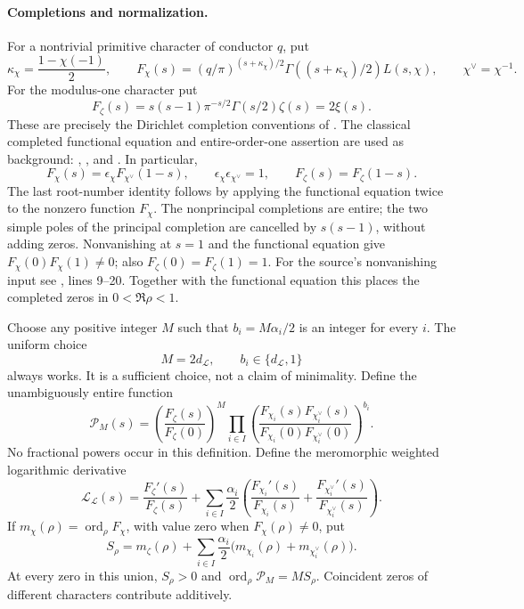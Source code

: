 \paragraph{Completions and normalization.}
For a nontrivial primitive character of conductor $q$, put
\[
 \kappa_\chi=\frac{1-\chi(-1)}2,\qquad
 F_\chi(s)=
 (q/\pi)^{(s+\kappa_\chi)/2}
 \Gamma((s+\kappa_\chi)/2)L(s,\chi),
 \qquad \chi^\vee=\chi^{-1}.
\]
For the modulus-one character put
\[
 F_\zeta(s)=s(s-1)\pi^{-s/2}\Gamma(s/2)\zeta(s)=2\xi(s).
\]
These are precisely the Dirichlet completion conventions of
. The classical completed functional equation and
entire-order-one assertion are used as background:
\cite[(25.15.5)--(25.15.6)]{dlmf2515},
\cite[\S6.1; (6.2.2)]{kedlayaFE}, and
\cite[\S1, p.~282]{rajan1998}.
In particular,
\[
 F_\chi(s)=\epsilon_\chi F_{\chi^\vee}(1-s),
 \qquad \epsilon_\chi\epsilon_{\chi^\vee}=1,\qquad
 F_\zeta(s)=F_\zeta(1-s).
\]
The last root-number identity follows by applying the functional equation
twice to the nonzero function $F_\chi$.
The nonprincipal completions are entire; the two simple poles of the
principal completion are cancelled by $s(s-1)$, without adding zeros.
Nonvanishing at $s=1$ and the functional equation give
$F_\chi(0)F_\chi(1)\ne0$; also
$F_\zeta(0)=F_\zeta(1)=1$.
For the source's nonvanishing input see
,
lines 9--20. Together with the functional equation this places the
completed zeros in $0<\Re\rho<1$.

Choose any positive integer $M$ such that
$b_i=M\alpha_i/2$ is an integer for every $i$.
The uniform choice
\[
 M=2d_{\mathcal L},\qquad
 b_i\in\{d_{\mathcal L},1\}
\]
always works. It is a sufficient choice, not a claim of minimality.
Define the unambiguously entire function
\begin{equation}\label{eq:DET18completedproduct}
 \mathscr P_M(s)=
 \left(\frac{F_\zeta(s)}{F_\zeta(0)}\right)^M
 \prod_{i\in I}
 \left(
 \frac{F_{\chi_i}(s)F_{\chi_i^\vee}(s)}
 {F_{\chi_i}(0)F_{\chi_i^\vee}(0)}
 \right)^{b_i}.
\end{equation}
No fractional powers occur in this definition. Define the meromorphic
weighted logarithmic derivative
\begin{equation}\label{eq:DET18weightedlog}
 \mathscr L_{\mathcal L}(s)=
 \frac{F_\zeta'(s)}{F_\zeta(s)}
 +\sum_{i\in I}\frac{\alpha_i}{2}
 \left(
 \frac{F_{\chi_i}'(s)}{F_{\chi_i}(s)}
 +\frac{F_{\chi_i^\vee}'(s)}{F_{\chi_i^\vee}(s)}
 \right).
\end{equation}
If $m_\chi(\rho)=\operatorname{ord}_\rho F_\chi$, with value zero
when $F_\chi(\rho)\ne0$, put
\begin{equation}\label{eq:DET18weightedmultiplicity}
 S_\rho=m_\zeta(\rho)+
 \sum_{i\in I}\frac{\alpha_i}{2}
 \bigl(m_{\chi_i}(\rho)+m_{\chi_i^\vee}(\rho)\bigr).
\end{equation}
At every zero in this union, $S_\rho>0$ and
$\operatorname{ord}_\rho\mathscr P_M=MS_\rho$.
Coincident zeros of different characters contribute additively.

